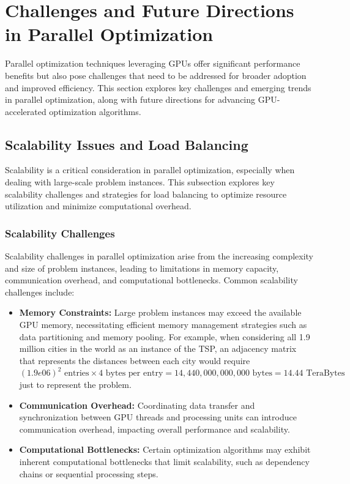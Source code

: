 \documentclass[11pt]{report}
\begin{document}
    \section{Challenges and Future Directions in Parallel Optimization}
    Parallel optimization techniques leveraging GPUs offer significant performance benefits but also pose challenges that need to be addressed for broader adoption and improved efficiency. This section explores key challenges and emerging trends in parallel optimization, along with future directions for advancing GPU-accelerated optimization algorithms.
    
        \subsection{Scalability Issues and Load Balancing}
        Scalability is a critical consideration in parallel optimization, especially when dealing with large-scale problem instances. This subsection explores key scalability challenges and strategies for load balancing to optimize resource utilization and minimize computational overhead.
        
        \subsubsection{Scalability Challenges}
            Scalability challenges in parallel optimization arise from the increasing complexity and size of problem instances, leading to limitations in memory capacity, communication overhead, and computational bottlenecks. Common scalability challenges include:
            \begin{itemize}
                \item \textbf{Memory Constraints:} Large problem instances may exceed the available GPU memory, necessitating efficient memory management strategies such as data partitioning and memory pooling. For example, when considering all 1.9 million cities in the world as an instance of the TSP, an adjacency matrix that represents the distances between each city would require $\left(1.9e06\right)^2\text{ entries} \times 4 \text{ bytes per entry} = 14,440,000,000,000 \text{ bytes} = 14.44 \text{ TeraBytes}$ just to represent the problem. 
            
                \item \textbf{Communication Overhead:} Coordinating data transfer and synchronization between GPU threads and processing units can introduce communication overhead, impacting overall performance and scalability.
            
                \item \textbf{Computational Bottlenecks:} Certain optimization algorithms may exhibit inherent computational bottlenecks that limit scalability, such as dependency chains or sequential processing steps.
            \end{itemize}
            
\end{document}

